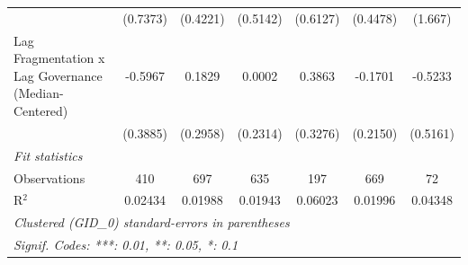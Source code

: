 \begin{table}[H]
\begin{tabular}{lcccccc}
                                                           & (0.7373)     & (0.4221)       & (0.5142)     & (0.6127)     & (0.4478)       & (1.667)\\   
      Lag Fragmentation x Lag Governance (Median-Centered) & -0.5967      & 0.1829         & 0.0002       & 0.3863       & -0.1701        & -0.5233\\   
                                                           & (0.3885)     & (0.2958)       & (0.2314)     & (0.3276)     & (0.2150)       & (0.5161)\\   
      \midrule
      \emph{Fit statistics}\\
      Observations                                         & 410          & 697            & 635          & 197          & 669            & 72\\  
      R$^2$                                                & 0.02434      & 0.01988        & 0.01943      & 0.06023      & 0.01996        & 0.04348\\  
      \midrule \midrule
      \multicolumn{7}{l}{\emph{Clustered (GID\_0) standard-errors in parentheses}}\\
      \multicolumn{7}{l}{\emph{Signif. Codes: ***: 0.01, **: 0.05, *: 0.1}}\\
   \end{tabular}
\end{table}


